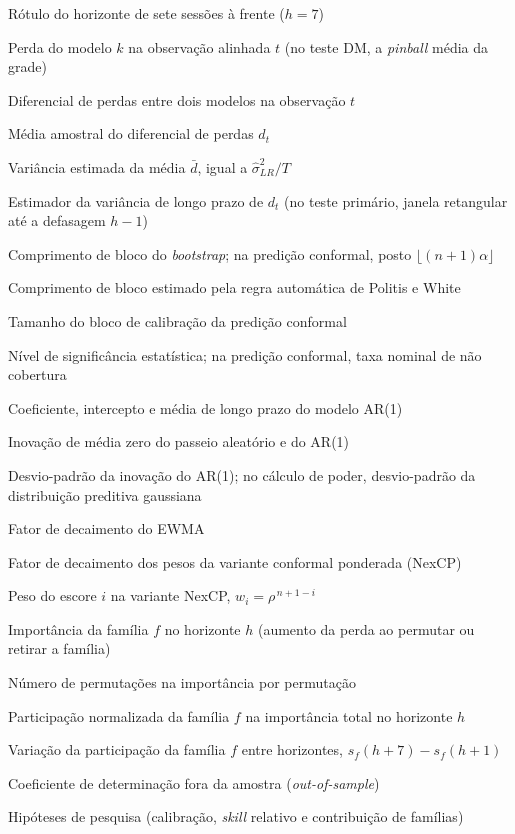 \begin{simbolos}
    \item[$h+7$] Rótulo do horizonte de sete sessões à frente (\(h = 7\))
    \item[$L_t^{(k)}$] Perda do modelo $k$ na observação alinhada $t$ (no teste DM, a \textit{pinball} média da grade)
    \item[$d_t$] Diferencial de perdas entre dois modelos na observação $t$
    \item[$\bar{d}$] Média amostral do diferencial de perdas $d_t$
    \item[$\widehat{\mathrm{Var}}(\bar{d})$] Variância estimada da média $\bar{d}$, igual a $\hat{\sigma}^2_{LR}/T$
    \item[$\hat{\sigma}^2_{LR}$] Estimador da variância de longo prazo de $d_t$ (no teste primário, janela retangular até a defasagem $h-1$)
    \item[$l$] Comprimento de bloco do \textit{bootstrap}; na predição conformal, posto $\lfloor (n+1)\alpha \rfloor$
    \item[$\hat{b}$] Comprimento de bloco estimado pela regra automática de Politis e White
    \item[$n$] Tamanho do bloco de calibração da predição conformal
    \item[$\alpha$] Nível de significância estatística; na predição conformal, taxa nominal de não cobertura
    \item[$\phi$, $c$, $\mu$] Coeficiente, intercepto e média de longo prazo do modelo AR(1)
    \item[$\varepsilon_t$] Inovação de média zero do passeio aleatório e do AR(1)
    \item[$\sigma$] Desvio-padrão da inovação do AR(1); no cálculo de poder, desvio-padrão da distribuição preditiva gaussiana
    \item[$\lambda$] Fator de decaimento do EWMA
    \item[$\rho$] Fator de decaimento dos pesos da variante conformal ponderada (NexCP)
    \item[$w_i$] Peso do escore $i$ na variante NexCP, $w_i = \rho^{\,n+1-i}$
    \item[$I_f(h)$] Importância da família $f$ no horizonte $h$ (aumento da perda ao permutar ou retirar a família)
    \item[$K_p$] Número de permutações na importância por permutação
    \item[$s_f(h)$] Participação normalizada da família $f$ na importância total no horizonte $h$
    \item[$\Delta_f$] Variação da participação da família $f$ entre horizontes, $s_f(h+7) - s_f(h+1)$
    \item[$R^2$] Coeficiente de determinação fora da amostra (\textit{out-of-sample})
    \item[H1, H2, H3] Hipóteses de pesquisa (calibração, \textit{skill} relativo e contribuição de famílias)
\end{simbolos}
